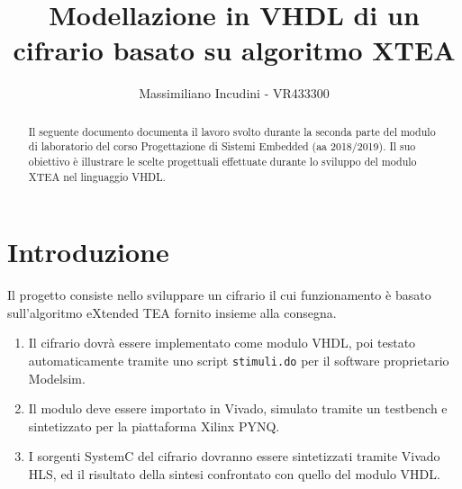 \documentclass[]{IEEEtran}
\title{Modellazione in VHDL di un cifrario basato su algoritmo XTEA}
\author{Massimiliano Incudini - VR433300}
\newcommand{\code}[1]{\texttt{#1}}
\begin{document}
\maketitle

\begin{abstract}
    Il seguente documento documenta il lavoro svolto durante la seconda parte del modulo di laboratorio del corso Progettazione di Sistemi Embedded (aa 2018/2019). Il suo obiettivo è illustrare le scelte progettuali effettuate durante lo sviluppo del modulo XTEA nel linguaggio VHDL.
\end{abstract}
\section{Introduzione}

Il progetto consiste nello sviluppare un cifrario il cui funzionamento è basato sull'algoritmo eXtended TEA fornito insieme alla consegna.
\begin{enumerate}
    \item Il cifrario dovrà essere implementato come modulo VHDL, poi testato automaticamente tramite uno script \code{stimuli.do} per il software proprietario \textsf{\small Modelsim}.
    \item Il modulo deve essere importato in \textsf{\small Vivado}, simulato tramite un testbench e sintetizzato per la piattaforma \textsf{\small Xilinx PYNQ}.
    \item I sorgenti SystemC del cifrario dovranno essere sintetizzati tramite \textsf{\small Vivado HLS}, ed il risultato della sintesi confrontato con quello del modulo VHDL.
\end{enumerate}








\end{document}
